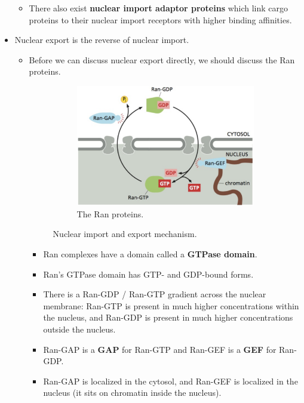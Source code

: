 \documentclass[../notes.tex]{subfiles}
\begin{document}
\begin{itemize}
\begin{itemize}
        \item There also exist \textbf{nuclear import adaptor proteins} which link cargo proteins to their nuclear import receptors with higher binding affinities.
    \end{itemize}
    \item Nuclear export is the reverse of nuclear import.
    \begin{itemize}
        \item Before we can discuss nuclear export directly, we should discuss the Ran proteins.
        \begin{figure}[h!]
            \centering
            \begin{subfigure}[b]{0.49\linewidth}
                \centering
                \includegraphics[width=0.8\linewidth]{../ExtFiles/nuclearImpExpa.png}
                \caption{The Ran proteins.}
                \label{fig:nuclearImpExpa}
            \end{subfigure}
            \caption{Nuclear import and export mechanism.}
        \end{figure}
        \begin{itemize}
            \item Ran complexes have a domain called a \textbf{GTPase domain}.
            \item Ran's GTPase domain has GTP- and GDP-bound forms.
            \item There is a Ran-GDP / Ran-GTP gradient across the nuclear membrane: Ran-GTP is present in much higher concentrations within the nucleus, and Ran-GDP is present in much higher concentrations outside the nucleus.
            \item Ran-GAP is a \textbf{GAP} for Ran-GTP and Ran-GEF is a \textbf{GEF} for Ran-GDP.
            \item Ran-GAP is localized in the cytosol, and Ran-GEF is localized in the nucleus (it sits on chromatin inside the nucleus).

\end{itemize}
\end{itemize}
\end{itemize}
\end{document}
